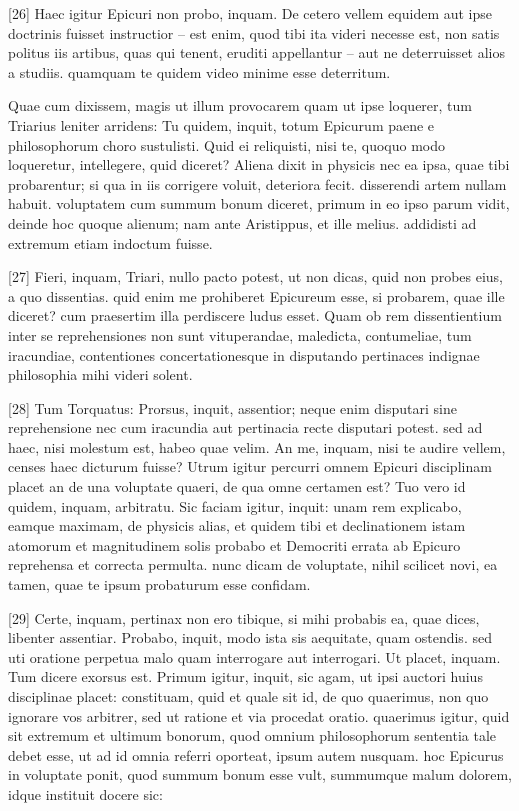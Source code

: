 \documentclass{article}
\begin{document}
[26] Haec igitur Epicuri non probo, inquam. De cetero vellem equidem aut ipse doctrinis fuisset instructior -- est enim, quod tibi ita videri necesse est, non satis politus iis artibus, quas qui tenent, eruditi appellantur -- aut ne deterruisset alios a studiis. quamquam te quidem video minime esse deterritum.

Quae cum dixissem, magis ut illum provocarem quam ut ipse loquerer, tum Triarius leniter arridens: Tu quidem, inquit, totum Epicurum paene e philosophorum choro sustulisti. Quid ei reliquisti, nisi te, quoquo modo loqueretur, intellegere, quid diceret? Aliena dixit in physicis nec ea ipsa, quae tibi probarentur; si qua in iis corrigere voluit, deteriora fecit. disserendi artem nullam habuit. voluptatem cum summum bonum diceret, primum in eo ipso parum vidit, deinde hoc quoque alienum; nam ante Aristippus, et ille melius. addidisti ad extremum etiam indoctum fuisse.

[27] Fieri, inquam, Triari, nullo pacto potest, ut non dicas, quid non probes eius, a quo dissentias. quid enim me prohiberet Epicureum esse, si probarem, quae ille diceret? cum praesertim illa perdiscere ludus esset. Quam ob rem dissentientium inter se reprehensiones non sunt vituperandae, maledicta, contumeliae, tum iracundiae, contentiones concertationesque in disputando pertinaces indignae philosophia mihi videri solent.

[28] Tum Torquatus: Prorsus, inquit, assentior; neque enim disputari sine reprehensione nec cum iracundia aut pertinacia recte disputari potest. sed ad haec, nisi molestum est, habeo quae velim. An me, inquam, nisi te audire vellem, censes haec dicturum fuisse? Utrum igitur percurri omnem Epicuri disciplinam placet an de una voluptate quaeri, de qua omne certamen est? Tuo vero id quidem, inquam, arbitratu. Sic faciam igitur, inquit: unam rem explicabo, eamque maximam, de physicis alias, et quidem tibi et declinationem istam atomorum et magnitudinem solis probabo et Democriti errata ab Epicuro reprehensa et correcta permulta. nunc dicam de voluptate, nihil scilicet novi, ea tamen, quae te ipsum probaturum esse confidam.

[29] Certe, inquam, pertinax non ero tibique, si mihi probabis ea, quae dices, libenter assentiar. Probabo, inquit, modo ista sis aequitate, quam ostendis. sed uti oratione perpetua malo quam interrogare aut interrogari. Ut placet, inquam. Tum dicere exorsus est. Primum igitur, inquit, sic agam, ut ipsi auctori huius disciplinae placet: constituam, quid et quale sit id, de quo quaerimus, non quo ignorare vos arbitrer, sed ut ratione et via procedat oratio. quaerimus igitur, quid sit extremum et ultimum bonorum, quod omnium philosophorum sententia tale debet esse, ut ad id omnia referri oporteat, ipsum autem nusquam. hoc Epicurus in voluptate ponit, quod summum bonum esse vult, summumque malum dolorem, idque instituit docere sic:
\end{document}
